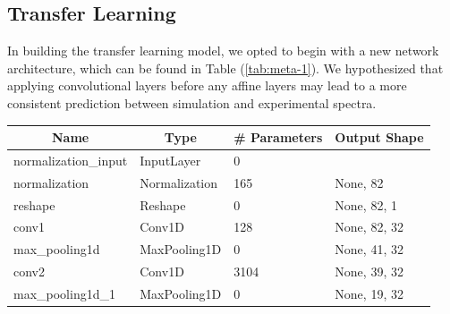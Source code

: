 \subsection{Transfer Learning}
In building the transfer learning model, we opted to begin with a new network architecture, which can be found in Table (\ref{tab:meta-1}). We hypothesized that applying convolutional layers before any affine layers may lead to a more consistent prediction between simulation and experimental spectra.


\bgroup
\def\arraystretch{1.5}
\begin{table}[]
    \centering
    \begin{tabular}{|l|l|l|l|}
    \hline
    \multicolumn{1}{|c|}{\textbf{Name}} & \multicolumn{1}{c|}{\textbf{Type}} & \multicolumn{1}{c|}{\textbf{\# Parameters}} & \multicolumn{1}{c|}{\textbf{Output Shape}} \\ \hline
    normalization\_input                & InputLayer                         & 0                                           &                                            \\ \hline
    normalization                       & Normalization                      & 165                                         & None, 82                                   \\ \hline
    reshape                             & Reshape                            & 0                                           & None, 82, 1                                \\ \hline
    conv1                               & Conv1D                             & 128                                         & None, 82, 32                               \\ \hline
    max\_pooling1d                      & MaxPooling1D                       & 0                                           & None, 41, 32                               \\ \hline
    conv2                               & Conv1D                             & 3104                                        & None, 39, 32                               \\ \hline
    max\_pooling1d\_1                   & MaxPooling1D                       & 0                                           & None, 19, 32                               \\ \hline

\end{tabular}
\end{table}
